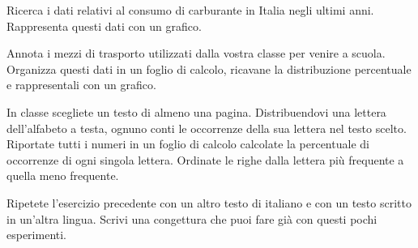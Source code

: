 \begin{esercizio}
Ricerca i dati relativi al consumo di carburante in Italia negli ultimi
anni. Rappresenta questi dati con un grafico.
\end{esercizio}

\begin{esercizio}
Annota i mezzi di trasporto utilizzati dalla vostra classe per venire
a scuola. Organizza questi dati in un foglio di calcolo, ricavane
la distribuzione percentuale e rappresentali con un grafico.
\end{esercizio}

\begin{esercizio}
In classe scegliete un testo di almeno una pagina. Distribuendovi una
lettera dell'alfabeto a testa, ognuno conti le occorrenze della sua
lettera nel testo scelto. Riportate tutti i numeri in un foglio di calcolo
calcolate la percentuale di occorrenze di ogni singola lettera.
Ordinate le righe dalla lettera più frequente a quella meno frequente.
\end{esercizio}

\begin{esercizio}
Ripetete l'esercizio precedente con un altro testo di italiano e con un
testo scritto in un'altra lingua. Scrivi una congettura che puoi fare
già con questi pochi esperimenti.
\end{esercizio}
